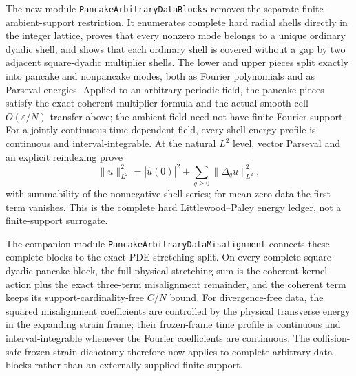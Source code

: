 \documentclass[11pt]{article}
\theoremstyle{definition}
\begin{document}
The new module \texttt{PancakeArbitraryDataBlocks} removes the separate
finite-ambient-support restriction.  It enumerates complete hard radial shells
directly in the integer lattice, proves that every nonzero mode belongs to a
unique ordinary dyadic shell, and shows that each ordinary shell is covered
without a gap by two adjacent square-dyadic multiplier shells.  The lower and
upper pieces split exactly into pancake and nonpancake modes, both as Fourier
polynomials and as Parseval energies.  Applied to an arbitrary periodic field,
the pancake pieces satisfy the exact coherent multiplier formula and the
actual smooth-cell $O(\varepsilon/N)$ transfer above; the ambient field need
not have finite Fourier support.  For a jointly continuous time-dependent
field, every shell-energy profile is continuous and interval-integrable.  At
the natural $L^2$ level, vector Parseval and an explicit reindexing prove
\[
  \|u\|_{L^2}^2
  = |\widehat u(0)|^2 + \sum_{q\geq0}\|\Delta_q u\|_{L^2}^2,
\]
with summability of the nonnegative shell series; for mean-zero data the first
term vanishes.  This is the complete hard Littlewood--Paley energy ledger,
not a finite-support surrogate.

The companion module \texttt{PancakeArbitraryDataMisalignment} connects these
complete blocks to the exact PDE stretching split.  On every complete
square-dyadic pancake block, the full physical stretching sum is the coherent
kernel action plus the exact three-term misalignment remainder, and the
coherent term keeps its support-cardinality-free $C/N$ bound.  For
divergence-free data, the squared misalignment coefficients are controlled by
the physical transverse energy in the expanding strain frame; their
frozen-frame time profile is continuous and interval-integrable whenever the
Fourier coefficients are continuous.  The collision-safe frozen-strain
dichotomy therefore now applies to complete arbitrary-data blocks rather than
an externally supplied finite support.
\end{document}

